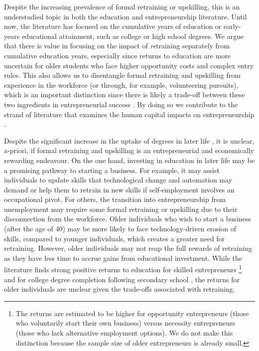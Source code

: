\documentclass[12pt, a4paper]{article}
\begin{document}
Despite the increasing prevalence of formal retraining or upskilling, this is an understudied topic in both the education and entrepreneurship literature. Until now, the literature has focused on the cumulative years of education or early-years educational attainment, such as college or high school degrees. We argue that there is value in focusing on the impact of \textit{re}training separately from cumulative education years, especially since returns to education are more uncertain for older students who face higher opportunity costs and complex entry rules. This also allows us to disentangle formal retraining and upskilling from experience in the workforce (or through, for example, volunteering pursuits), which is an important distinction since there is likely a trade-off between these two ingredients in entrepreneurial success \citep{zacharakis2000}. By doing so we contribute to the strand of literature that examines the human capital impacts on entrepreneurship \citep{unger2011}. 

Despite the significant increase in the uptake of degrees in later life \citep{oecd2016}, it is unclear, a-priori, if formal retraining and upskilling is an entrepreneurial and economically rewarding endeavour. On the one hand, investing in education in later life may be a promising pathway to starting a business. For example, it may assist individuals to update skills that technological change and automation may demand \citep{autor2008, acemoglu2011} or help them to retrain in new skills if self-employment involves an occupational pivot. For others, the transition into entrepreneurship from unemployment may require some formal retraining or upskilling due to their disconnection from the workforce. Older individuals who wish to start a business (after the age of 40) may be more likely to face technology-driven erosion of skills, compared to younger individuals, which creates a greater need for retraining. However, older individuals may not reap the full rewards of retraining as they have less time to accrue gains from educational investment. While the literature finds strong positive returns to education for skilled entrepreneurs \citep{fossen2013}\footnote{The returns are estimated to be higher for opportunity entrepreneurs (those who voluntarily start their own business) versus necessity entrepreneurs (those who lack alternative employment options). We do not make this distinction because the sample size of older entrepreneurs is already small.} and for college degree completion following secondary school \citep{jacobson2005, chesters2015, zeidenberg2015, polidano2016, xu2016, belfield2017, dynarski2016, dynarski2018, mountjoy2022}, the returns for older individuals are unclear given the trade-offs associated with retraining. 
\end{document}
